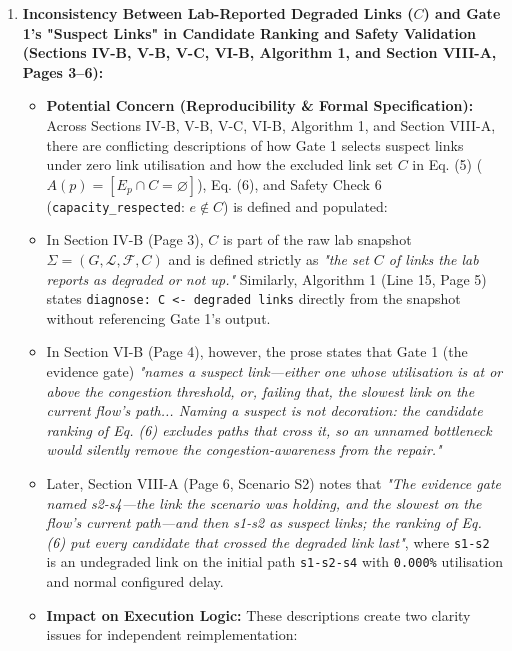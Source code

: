 \documentclass[11pt,a4paper]{article}
\begin{document}
\begin{enumerate}[leftmargin=1.6em,itemsep=3pt]
\item \textbf{Inconsistency Between Lab-Reported Degraded Links ($C$) and Gate 1's "Suspect Links" in Candidate Ranking and Safety Validation (Sections IV-B, V-B, V-C, VI-B, Algorithm 1, and Section VIII-A, Pages 3–6):}
\begin{itemize}[leftmargin=1.8em,itemsep=2pt]
\item \textbf{Potential Concern (Reproducibility \& Formal Specification):} Across Sections IV-B, V-B, V-C, VI-B, Algorithm 1, and Section VIII-A, there are conflicting descriptions of how Gate 1 selects suspect links under zero link utilisation and how the excluded link set $C$ in Eq. (5) ($A(p) = [E_p \cap C = \varnothing]$), Eq. (6), and Safety Check 6 (\texttt{capacity\_respected}: $e \notin C$) is defined and populated:
\item In Section IV-B (Page 3), $C$ is part of the raw lab snapshot $\Sigma = (G, \mathcal{L}, \mathcal{F}, C)$ and is defined strictly as \emph{"the set $C$ of links the lab reports as degraded or not up."} Similarly, Algorithm 1 (Line 15, Page 5) states \texttt{diagnose: C <- degraded links} directly from the snapshot without referencing Gate 1's output.
\item In Section VI-B (Page 4), however, the prose states that Gate 1 (the evidence gate) \emph{"names a suspect link—either one whose utilisation is at or above the congestion threshold, or, failing that, the slowest link on the current flow's path... Naming a suspect is not decoration: the candidate ranking of Eq. (6) excludes paths that cross it, so an unnamed bottleneck would silently remove the congestion-awareness from the repair."}
\item Later, Section VIII-A (Page 6, Scenario S2) notes that \emph{"The evidence gate named s2-s4—the link the scenario was holding, and the slowest on the flow's current path—and then s1-s2 as suspect links; the ranking of Eq. (6) put every candidate that crossed the degraded link last"}, where \texttt{s1-s2} is an undegraded link on the initial path \texttt{s1-s2-s4} with \texttt{0.000\%} utilisation and normal configured delay.
\item \textbf{Impact on Execution Logic:} These descriptions create two clarity issues for independent reimplementation:
\end{itemize}
\end{enumerate}
\end{document}

